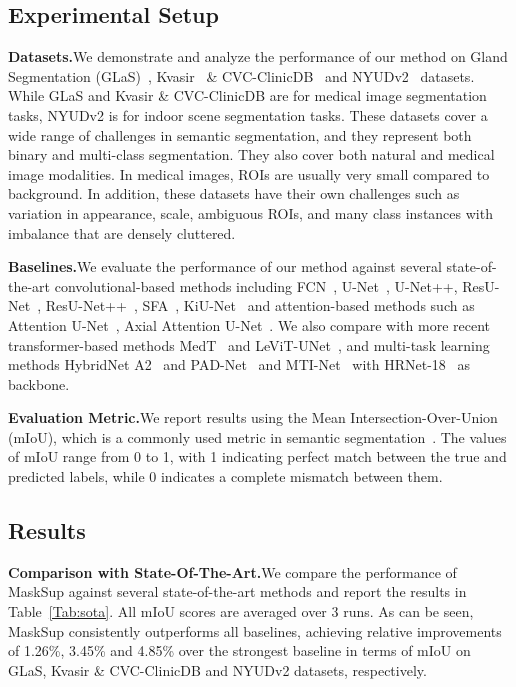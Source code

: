 \documentclass{bmvc2k}
\begin{document}
\subsection{Experimental Setup}
\noindent\textbf{Datasets.}\quad We demonstrate and analyze the performance of our method on Gland Segmentation (GLaS)~\cite{sirinukunwattana2017gland}, Kvasir~\cite{jha2020kvasir} \& CVC-ClinicDB~\cite{bernal2015wm} and NYUDv2~\cite{Silberman:ECCV12} datasets. While GLaS and Kvasir \& CVC-ClinicDB are for medical image segmentation tasks, NYUDv2 is for indoor scene segmentation tasks. These datasets cover a wide range of challenges in semantic segmentation, and they represent both binary and multi-class segmentation. They also cover both natural and medical image modalities. In medical images, ROIs are usually very small compared to background. In addition, these datasets have their own challenges such as variation in appearance, scale, ambiguous ROIs, and many class instances with imbalance that are densely cluttered.

\medskip\noindent\textbf{Baselines.}\quad We evaluate the performance of our method against several state-of-the-art convolutional-based methods including FCN~\cite{long2015fully}, U-Net~\cite{ronneberger2015u}, U-Net++\cite{zhou2019unet++}, ResU-Net~\cite{xiao2018weighted}, ResU-Net++~\cite{jha2019resunet++}, SFA~\cite{fang2019selective}, KiU-Net~\cite{valanarasu2021kiu} and attention-based methods such as Attention U-Net~\cite{oktay2018attention}, Axial Attention U-Net~\cite{wang2020axial}. We also compare with more recent transformer-based methods MedT~\cite{valanarasu2021medical} and LeViT-UNet~\cite{xu2021levit}, and multi-task learning methods HybridNet A2~\cite{lin2019depth} and PAD-Net~\cite{xu2018pad} and MTI-Net~\cite{vandenhende2020mti} with HRNet-18~\cite{wang2020deep} as backbone.

\medskip\noindent\textbf{Evaluation Metric.}\quad We report results using the Mean Intersection-Over-Union (mIoU), which is a commonly used metric in semantic segmentation~\cite{ronneberger2015u,wang2020axial,valanarasu2021medical,valanarasu2021kiu,xu2021levit}. The values of mIoU range from 0 to 1, with 1 indicating perfect match between the true and predicted labels, while 0 indicates a complete mismatch between them.

\subsection{Results}
\noindent\textbf{Comparison with State-Of-The-Art.}\quad We compare the performance of MaskSup against several state-of-the-art methods and report the results in Table~\ref{Tab:sota}. All mIoU scores are averaged over 3 runs. As can be seen, MaskSup consistently outperforms all baselines, achieving relative improvements of 1.26\%, 3.45\% and 4.85\% over the strongest baseline in terms of mIoU on GLaS, Kvasir \& CVC-ClinicDB and NYUDv2 datasets, respectively.
\end{document}
